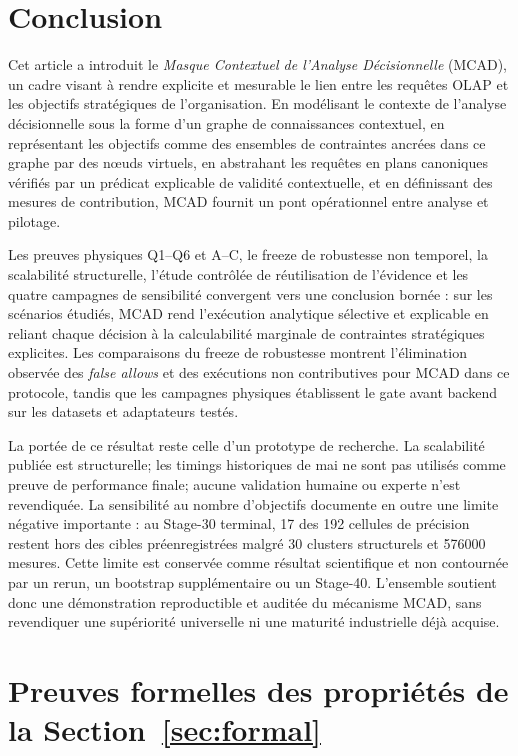 \documentclass[journal]{IEEEtran}
\begin{document}
\section{Conclusion}
\label{sec:conclusion}

Cet article a introduit le \emph{Masque Contextuel de l'Analyse Décisionnelle} (MCAD), un cadre visant à rendre explicite et mesurable le lien entre les requêtes OLAP et les objectifs stratégiques de l'organisation. En modélisant le contexte de l'analyse décisionnelle sous la forme d'un graphe de connaissances contextuel, en représentant les objectifs comme des ensembles de contraintes ancrées dans ce graphe par des nœuds virtuels, en abstrahant les requêtes en plans canoniques vérifiés par un prédicat explicable de validité contextuelle, et en définissant des mesures de contribution, MCAD fournit un pont opérationnel entre analyse et pilotage.

Les preuves physiques Q1--Q6 et A--C, le freeze de robustesse non temporel,
la scalabilité structurelle, l'étude contrôlée de réutilisation de l'évidence
et les quatre campagnes de sensibilité convergent vers une conclusion bornée :
sur les scénarios étudiés, MCAD rend l'exécution analytique sélective et
explicable en reliant chaque décision à la calculabilité marginale de
contraintes stratégiques explicites. Les comparaisons du freeze de robustesse
montrent l'élimination observée des \emph{false allows} et des exécutions non
contributives pour MCAD dans ce protocole, tandis que les campagnes physiques
établissent le gate avant backend sur les datasets et adaptateurs testés.

La portée de ce résultat reste celle d'un prototype de recherche. La
scalabilité publiée est structurelle; les timings historiques de mai ne sont
pas utilisés comme preuve de performance finale; aucune validation humaine ou
experte n'est revendiquée. La sensibilité au nombre d'objectifs documente en
outre une limite négative importante : au Stage-30 terminal, 17 des 192
cellules de précision restent hors des cibles préenregistrées malgré 30
clusters structurels et 576000 mesures. Cette limite est conservée comme
résultat scientifique et non contournée par un rerun, un bootstrap
supplémentaire ou un Stage-40. L'ensemble soutient donc une démonstration
reproductible et auditée du mécanisme MCAD, sans revendiquer une supériorité
universelle ni une maturité industrielle déjà acquise.

\appendices

\section{Preuves formelles des propriétés de la Section~\ref{sec:formal}}
\label{app:proofs}
\end{document}
